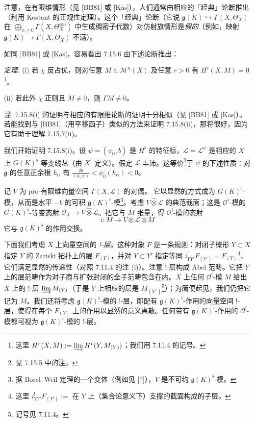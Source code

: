 注意，在有限维情形（见 [BB81] 或 [Kas]），人们通常由相应的「经典」论断推出%
（利用 Kostant 的正规性定理）。这个「经典」论断（它说 $\mathfrak{g}(K)\hookrightarrow\Gamma(X,\Theta_X)$ 在 $\bigoplus_{n\ge0}\Gamma(X,\Theta_X^{\otimes n})$ 中生成稠密子代数）对仿射旗情形是\emph{假的}（例如，映射 $\mathfrak{g}(K)\to\Gamma(X,\Theta_X)$ 不满）。

如同 [BB81] 或 [Kas]，容易看出 7.15.6 由下述论断推出：

 \emph{定理.} (i) 若 $\chi$ 反占优，则对任意 $M\in\mathcal{M}^{\chi}(X)$ 及任意 $r>0$ 有 $H^{r}(X,M)=0$\footnote{这里 $H^{r}(X,M):=\varinjlim H^{r}(Y,M_{(Y)})$；我们用 7.11.4 的记号。}。

(ii) 若此外 $\chi$ 正则且 $M\ne0$，则 $\Gamma M\ne0$。

\emph{注.} 7.15.8(i) 的证明与相应的有限维论断的证明十分相似（见 [BB81] 或 [Kas]）。若能找到与 [BB81]（用平移函子）类似的方法来证明 7.15.8(ii)，那将很好，因为它有助于理解 7.15.7(ii)。

 我们开始证明 7.15.8(i)。设 $\psi=(\psi_0,b)$ 是 $H^{\flat}$ 的特征标，$\mathcal{L}=\mathcal{L}^{\psi}$ 是相应的 $X$ 上 $G(K)^{\flat}$-等变线丛（由 $X^{\dagger}$ 定义）。假定 $\mathcal{L}$ 丰沛。这等价\footnote{见 7.15.5 中的注。}于 $\psi$ 的下述性质：对 $\mathfrak{g}$ 的任意正余根 $h_{\alpha}$ 有 $\frac{2b}{(\alpha,\alpha)}<\psi_0(h_{\alpha})<0$。

记 $V$ 为 pro-有限维向量空间 $\Gamma(X,\mathcal{L})$ 的对偶。%
它以显然的方式成为 $G(K)^{\flat}$-模，从而是水平 $-b$ 的可积 $\mathfrak{g}(K)^{\flat}$-模\footnote{据 Borel--Weil 定理的一个变体（例如见 [?]），$V$ 是不可约 $\mathfrak{g}(K)^{\flat}$-模。}。考虑 $V\widehat{\otimes}\mathcal{L}$ 的典范截面；这是 $\mathcal{O}^{\flat}$-模的 $G(K)^{\flat}$-等变态射 $\mathcal{O}_X\to V\widehat{\otimes}\mathcal{L}$。把它与 $M$ 张量，得 $\mathcal{O}^{!}$-模的态射
\begin{equation}\tag{388}
i:M\to V\otimes\mathcal{L}\otimes M
\end{equation}
它与 $\mathfrak{g}(K)^{\flat}$ 的作用交换。%

 下面我们考虑 $X$ 上向量空间的 \emph{!-层}。这种对象 $F$ 是一条规则：对闭子概形 $Y\subset X$ 指定 $Y$ 的 Zariski 拓扑上的层 $F_{(Y)}$，并对 $Y\subset Y'$ 指定等同 $i^{!}_{YY'}F_{(Y')}=F_{(Y)}$\footnote{这里 $i^{!}_{YY'}F_{(Y')}:=$ 在 $Y$ 上（集合论意义下）支撑的截面构成的子层。}，它们满足显然的传递性（对照 7.11.4 的注 (i)）。注意 !-层构成 Abel 范畴。它把 $Y$ 上的层范畴作为对子商与扩张封闭的全子范畴包含在内。$X$ 上任何 $\mathcal{O}^{!}$-模 $M$ 给出 $X$ 上的 !-层 $\varinjlim M_{(Y)}$（于是 $Y$ 上相应的层是 $M_{(Y^{\wedge})}$\footnote{记号见 7.11.4。}）；为简便起见，我们仍把它记为 $M$。我们还将考虑 $\mathfrak{g}(K)^{\flat}$-模的 !-层，即配有 $\mathfrak{g}(K)^{\flat}$-作用的向量空间 !-层，使得在每个 $F_{(Y)}$ 上的作用以显然的意义离散。任何带有 $\mathfrak{g}(K)^{\flat}$-作用的 $\mathcal{O}^{!}$-模都可视为 $\mathfrak{g}(K)^{\flat}$-模的 !-层。

